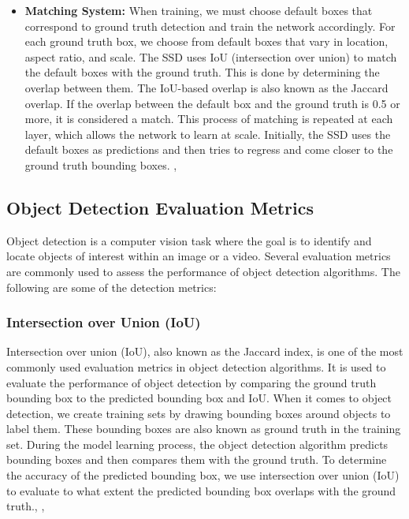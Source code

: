 \begin{itemize}
    \item \textbf{Matching System: } When training, we must choose default boxes that correspond to ground truth detection and train the network accordingly. For each ground truth box, we choose from default boxes that vary in location, aspect ratio, and scale.  The SSD uses IoU (intersection over union) to match the default boxes with the ground truth. This is done by determining the overlap between them. The IoU-based overlap is also known as the Jaccard overlap. If the overlap between the default box and the ground truth is 0.5 or more, it is considered a match. This process of matching is repeated at each layer, which allows the network to learn at scale. Initially, the SSD uses the default boxes as predictions and then tries to regress and come closer to the ground truth bounding boxes. \cite{ansari2020building}, \cite{liu2016ssd}

\end{itemize}

\subsection{Object Detection Evaluation Metrics}
Object detection is a computer vision task where the goal is to identify and locate objects of interest within an image or a video. Several evaluation metrics are commonly used to assess the performance of object detection algorithms. The following are some of the detection metrics:
\subsubsection{Intersection over Union (IoU)}
Intersection over union (IoU), also known as the Jaccard index, is one of the most commonly used evaluation metrics in object detection algorithms. It is used to evaluate the performance of object detection by comparing the ground truth bounding box to the predicted bounding box and IoU.
When it comes to object detection, we create training sets by drawing bounding boxes around objects to label them. These bounding boxes are also known as ground truth in the training set. During the model learning process, the object detection algorithm predicts bounding boxes and then compares them with the ground truth. To determine the accuracy of the predicted bounding box, we use intersection over union (IoU) to evaluate to what extent the predicted bounding box overlaps with the ground truth.\cite{ansari2020building}, \cite{bfortuner_mlglossary}, \cite{liu2016ssd}

